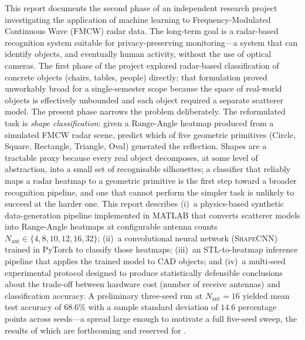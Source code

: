 \documentclass[letterpaper,11pt,leqno]{article}
\begin{document}
\begin{titlepage}
\maketitle

\noindent This report documents the second phase of an independent research project investigating the application of machine learning to Frequency-Modulated Continuous Wave (FMCW) radar data. The long-term goal is a radar-based recognition system suitable for privacy-preserving monitoring---a system that can identify objects, and eventually human activity, without the use of optical cameras. The first phase of the project explored radar-based classification of concrete objects (chairs, tables, people) directly; that formulation proved unworkably broad for a single-semester scope because the space of real-world objects is effectively unbounded and each object required a separate scatterer model. The present phase narrows the problem deliberately. The reformulated task is \emph{shape classification}: given a Range-Angle heatmap produced from a simulated FMCW radar scene, predict which of five geometric primitives (Circle, Square, Rectangle, Triangle, Oval) generated the reflection. Shapes are a tractable proxy because every real object decomposes, at some level of abstraction, into a small set of recognisable silhouettes; a classifier that reliably maps a radar heatmap to a geometric primitive is the first step toward a broader recognition pipeline, and one that cannot perform the simpler task is unlikely to succeed at the harder one. This report describes (i)~a physics-based synthetic data-generation pipeline implemented in MATLAB that converts scatterer models into Range-Angle heatmaps at configurable antenna counts $N_{\mathrm{ant}}\in\{4,8,10,12,16,32\}$; (ii)~a convolutional neural network (\textsc{ShapeCNN}) trained in PyTorch to classify those heatmaps; (iii)~an STL-to-heatmap inference pipeline that applies the trained model to CAD objects; and (iv)~a multi-seed experimental protocol designed to produce statistically defensible conclusions about the trade-off between hardware cost (number of receive antennas) and classification accuracy. A preliminary three-seed run at $N_{\mathrm{ant}}=16$ yielded mean test accuracy of $68.6\%$ with a sample standard deviation of $14.6$ percentage points across seeds---a spread large enough to motivate a full five-seed sweep, the results of which are forthcoming and reserved for .

\end{titlepage}
\end{document}
